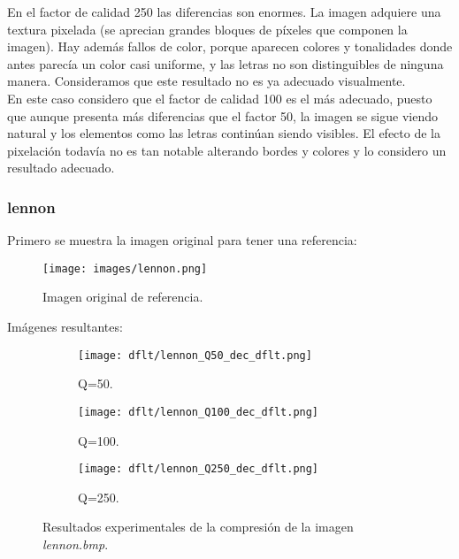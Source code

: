 \documentclass[12pt,a4paper]{article}
\begin{document}
En el factor de calidad 250 las diferencias son enormes. La imagen adquiere una textura pixelada (se aprecian grandes bloques de píxeles que componen la imagen). Hay además fallos de color, porque aparecen colores y tonalidades donde antes parecía un color casi uniforme, y las letras no son distinguibles de ninguna manera. Consideramos que este resultado no es ya adecuado visualmente.\\

En este caso considero que el factor de calidad 100 es el más adecuado, puesto que aunque presenta más diferencias que el factor 50, la imagen se sigue viendo natural y los elementos como las letras continúan siendo visibles. El efecto de la pixelación todavía no es tan notable alterando bordes y colores y lo considero un resultado adecuado.\\



\subsubsection{lennon}
Primero se muestra la imagen original para tener una referencia:
\begin{figure}[H]
    \centering
    \texttt{[image: images/lennon.png]}
    \caption[Referencia - lennon]{Imagen original de referencia.}
    
 \end{figure}   
    \vspace{0.5cm}
    
Imágenes resultantes:
\begin{figure}   [H]   
    \begin{subfigure}{0.30\textwidth}
        \centering
        \texttt{[image: dflt/lennon\_Q50\_dec\_dflt.png]}
        \caption{Q=50.}
        
    \end{subfigure}
    \hfill
    \begin{subfigure}{0.30\textwidth}
        \centering
        \texttt{[image: dflt/lennon\_Q100\_dec\_dflt.png]}
        \caption{Q=100.}
        
    \end{subfigure}
    \hfill
    \begin{subfigure}{0.30\textwidth}
        \centering
        \texttt{[image: dflt/lennon\_Q250\_dec\_dflt.png]}
        \caption{Q=250.}
        
    \end{subfigure}

    
    \caption[Resultados experimentales - lennon]{Resultados experimentales de la compresión de la imagen \textit{lennon.bmp}.}
    
\end{figure}
\end{document}

